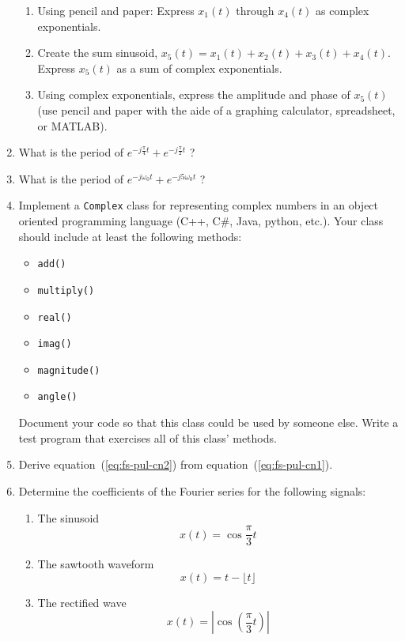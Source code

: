 \begin{enumerate}
\begin{enumerate}
\item Using pencil and paper: Express   $x_1(t)$ through $x_4(t)$ as complex exponentials. 

\item Create the sum sinusoid, $x_5(t)=x_1(t)+x_2(t)+x_3(t)+x_4(t)$. Express   $x_5(t)$ as a sum of complex exponentials. 	

 \item Using complex exponentials, express the amplitude and phase of $x_5(t)$ (use pencil and paper with the aide of a graphing calculator, spreadsheet, or MATLAB).

 \end{enumerate}
	
\item What is the period of $e^{-j\frac{\pi}{4}t}+e^{-j\frac{\pi}{2}t}$ ?
\item What is the period of $e^{-j \omega_0 t}+e^{-j 5\omega_0 t}$ ?
\item Implement a  \texttt{Complex} class for representing
  complex numbers in an object oriented programming language (C++, C\#, Java, python, etc.).  Your class should include at least the following
  methods:
  \begin{itemize}
  \item \texttt{add()}
  \item \texttt{multiply()}
  \item \texttt{real()}
  \item \texttt{imag()}
  \item \texttt{magnitude()}
  \item \texttt{angle()}
  \end{itemize}

  Document your code so that this class could be used by someone else.
  Write a test program that exercises all of this class' methods. 

\item Derive equation~(\ref{eq:fs-pul-cn2}) from
  equation~(\ref{eq:fs-pul-cn1}).

\item Determine the coefficients of the Fourier series for the following signals:
\begin{enumerate}
\item The sinusoid \[x(t) = \cos \frac{\pi}{3} t\]
\item The sawtooth waveform \[ x(t) = t-\lfloor t \rfloor \]
\item The rectified wave \[ x(t) = |\cos(\frac{\pi}{3} t)| \]
\end{enumerate}
\end{enumerate}

